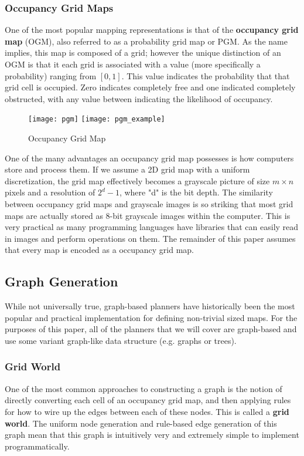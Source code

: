 \subsubsection{Occupancy Grid Maps}

One of the most popular mapping representations is that of the \textbf{occupancy grid map} (OGM), also referred to as a probability grid map or PGM. As the name implies, this map is composed of a grid; however the unique distinction of an OGM is that it each grid is associated with a value (more specifically a probability) ranging from $[0, 1]$. This value indicates the probability that that grid cell is occupied. Zero indicates completely free and one indicated completely obstructed, with any value between indicating the likelihood of occupancy. 


\begin{figure}[h!]
  \texttt{[image: pgm]}
  \texttt{[image: pgm\_example]}
  \centering
  \label{fig:grid_map}
  \caption{Occupancy Grid Map}
\end{figure}



One of the many advantages an occupancy grid map possesses is how computers store and process them. If we assume a 2D grid map with a uniform discretization, the grid map effectively becomes a grayscale picture of size $m \times n$ pixels and a resolution of $2^d-1$, where "d" is the bit depth. The similarity between occupancy grid maps and grayscale images is so striking that most grid maps are actually stored as 8-bit grayscale images within the computer. This is very practical as many programming languages have libraries that can easily read in images and perform operations on them. The remainder of this paper assumes that every map is encoded as a occupancy grid map. 

\subsection{Graph Generation}
While not universally true, graph-based planners have historically been the most popular and practical implementation for defining non-trivial sized maps. For the purposes of this paper, all of the planners that we will cover are graph-based and use some variant graph-like data structure (e.g. graphs or trees). 

\subsubsection{Grid World}
One of the most common approaches to constructing a graph is the notion of directly converting each cell of an occupancy grid map, and then applying rules for how to wire up the edges between each of these nodes. This is called a \textbf{grid world}. The uniform node generation and rule-based edge generation of this graph mean that this graph is intuitively very and extremely simple to implement programmatically.

